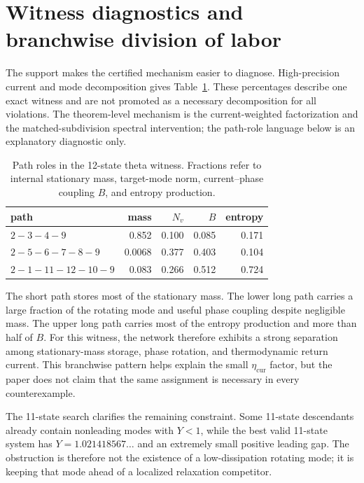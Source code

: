 \documentclass[aps,pre,reprint,groupedaddress,nofootinbib,showkeys,floatfix]{revtex4-2}
\newcommand{\Nv}{N_v}
\newcommand{\ecur}{\eta_{\mathrm{cur}}}
\begin{document}
\section{Witness diagnostics and branchwise division of labor}
The support makes the certified mechanism easier to diagnose. High-precision current and mode decomposition gives Table~\ref{tab:roles}. These percentages describe one exact witness and are not promoted as a necessary decomposition for all violations. The theorem-level mechanism is the current-weighted factorization and the matched-subdivision spectral intervention; the path-role language below is an explanatory diagnostic only.

\begin{table}[t]
\caption{Path roles in the 12-state theta witness. Fractions refer to internal stationary mass, target-mode norm, current--phase coupling $B$, and entropy production.}
\label{tab:roles}
\begin{ruledtabular}
\begin{tabular}{lrrrr}
path & mass & $\Nv$ & $B$ & entropy\\
\hline
$2-3-4-9$ & 0.852 & 0.100 & 0.085 & 0.171\\
$2-5-6-7-8-9$ & 0.0068 & 0.377 & 0.403 & 0.104\\
$2-1-11-12-10-9$ & 0.083 & 0.266 & 0.512 & 0.724\\
\end{tabular}
\end{ruledtabular}
\end{table}

The short path stores most of the stationary mass. The lower long path carries a large fraction of the rotating mode and useful phase coupling despite negligible mass. The upper long path carries most of the entropy production and more than half of $B$. For this witness, the network therefore exhibits a strong separation among stationary-mass storage, phase rotation, and thermodynamic return current. This branchwise pattern helps explain the small $\ecur$ factor, but the paper does not claim that the same assignment is necessary in every counterexample.

The 11-state search clarifies the remaining constraint. Some 11-state descendants already contain nonleading modes with $Y<1$, while the best valid 11-state system has $Y=1.021418567\ldots$ and an extremely small positive leading gap. The obstruction is therefore not the existence of a low-dissipation rotating mode; it is keeping that mode ahead of a localized relaxation competitor.
\end{document}
